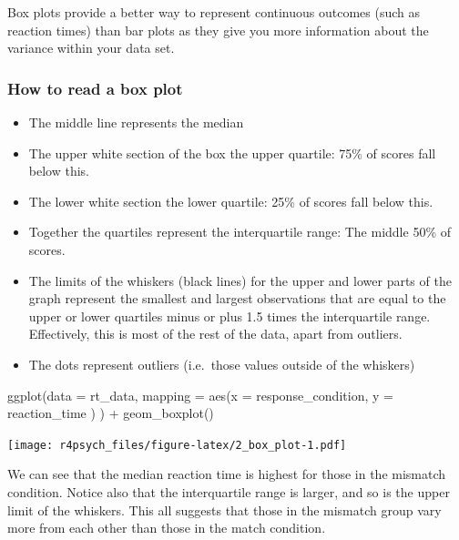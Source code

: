 \documentclass[
]{book}
\newenvironment{Shaded}{\begin{snugshade}}{\end{snugshade}}
\newcommand{\AttributeTok}[1]{\textcolor[rgb]{0.77,0.63,0.00}{#1}}
\newcommand{\FunctionTok}[1]{\textcolor[rgb]{0.00,0.00,0.00}{#1}}
\newcommand{\NormalTok}[1]{#1}
\newcommand{\SpecialCharTok}[1]{\textcolor[rgb]{0.00,0.00,0.00}{#1}}
\providecommand{\tightlist}{%
  \setlength{\itemsep}{0pt}\setlength{\parskip}{0pt}}
\begin{document}
Box plots provide a better way to represent continuous outcomes (such as reaction times) than bar plots as they give you more information about the variance within your data set.

\hypertarget{how-to-read-a-box-plot}{%
\subsubsection{How to read a box plot}\label{how-to-read-a-box-plot}}

\begin{itemize}
\tightlist
\item
  The middle line represents the median
\item
  The upper white section of the box the upper quartile: 75\% of scores fall below this.
\item
  The lower white section the lower quartile: 25\% of scores fall below this.
\item
  Together the quartiles represent the interquartile range: The middle 50\% of scores.
\item
  The limits of the whiskers (black lines) for the upper and lower parts of the graph represent the smallest and largest observations that are equal to the upper or lower quartiles minus or plus 1.5 times the interquartile range. Effectively, this is most of the rest of the data, apart from outliers.
\item
  The dots represent outliers (i.e.~those values outside of the whiskers)
\end{itemize}

\begin{Shaded}
\begin{Highlighting}[]
\FunctionTok{ggplot}\NormalTok{(}\AttributeTok{data =}\NormalTok{ rt\_data, }
       \AttributeTok{mapping =} \FunctionTok{aes}\NormalTok{(}\AttributeTok{x =}\NormalTok{ response\_condition, }
                     \AttributeTok{y =}\NormalTok{ reaction\_time}
\NormalTok{                     )}
\NormalTok{       ) }\SpecialCharTok{+}
  \FunctionTok{geom\_boxplot}\NormalTok{()}
\end{Highlighting}
\end{Shaded}

\texttt{[image: r4psych\_files/figure-latex/2\_box\_plot-1.pdf]}

We can see that the median reaction time is highest for those in the mismatch condition. Notice also that the interquartile range is larger, and so is the upper limit of the whiskers. This all suggests that those in the mismatch group vary more from each other than those in the match condition.
\end{document}

